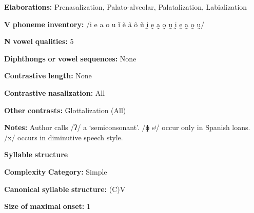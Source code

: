\begin{styleBody}
\textbf{Elaborations:} Prenasalization, Palato-alveolar, Palatalization, Labialization
\end{styleBody}

\begin{styleBody}
\textbf{V} \textbf{phoneme} \textbf{inventory:} /i e a o u ĩ ẽ ã õ ũ ḭ ḛ a̰ o̰ ṵ ḭ ḛ a̰ o̰ ṵ/
\end{styleBody}

\begin{styleBody}
\textbf{N} \textbf{vowel} \textbf{qualities:} 5
\end{styleBody}

\begin{styleBody}
\textbf{Diphthongs} \textbf{or} \textbf{vowel} \textbf{sequences:} None
\end{styleBody}

\begin{styleBody}
\textbf{Contrastive} \textbf{length:} None
\end{styleBody}

\begin{styleBody}
\textbf{Contrastive} \textbf{nasalization:} All
\end{styleBody}

\begin{styleBody}
\textbf{Other} \textbf{contrasts:} Glottalization (All)
\end{styleBody}

\begin{styleBody}
\textbf{Notes:} Author calls /ʔ/ a ‘semiconsonant’. /ɸ sʲ/ occur only in Spanish loans. /x/ occurs in diminutive speech style.
\end{styleBody}

\begin{styleBody}
\textbf{Syllable} \textbf{structure}
\end{styleBody}

\begin{styleBody}
\textbf{Complexity} \textbf{Category:} Simple
\end{styleBody}

\begin{styleBody}
\textbf{Canonical} \textbf{syllable} \textbf{structure:} (C)V \citep[14]{Bradley1970}
\end{styleBody}

\begin{styleBody}
\textbf{Size} \textbf{of} \textbf{maximal} \textbf{onset:} 1
\end{styleBody}


